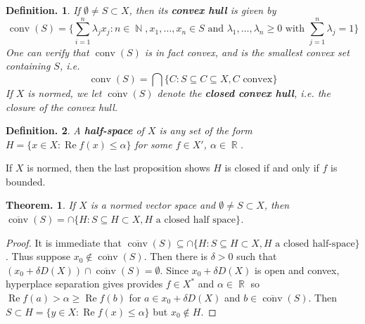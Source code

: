 \documentclass[11pt, a4paper]{memoir}
\DeclareMathOperator{\N}{{\mathbb{N}}}
\DeclareMathOperator{\R}{{\mathbb{R}}}
\theoremstyle{change}
\newtheorem{theorem}{Theorem.}[section]
\theoremstyle{plain}
\theoremstyle{nonumberplain}
\newtheorem{definition}{Definition.}
\newtheorem{proof}{Proof}
\renewcommand{\Re}{\ensuremath{\operatorname{Re}}}
\DeclareMathOperator{\conv}{conv}
\numberwithin{equation}{section}
\begin{document}
\begin{definition}
    If $\emptyset\neq S\subset X$, then its \textbf{convex hull} is given by
    \begin{equation*}
        \conv(S) = \{\sum_{i=1}^n\lambda_jx_j:n\in\N,x_1,\ldots,x_n\in S\text{ and }\lambda_1,\ldots,\lambda_n\geq 0\text{ with }\sum_{j=1}^n\lambda_j=1\}
    \end{equation*}
    One can verify that $\conv(S)$ is in fact convex, and is the smallest convex set containing $S$, i.e.
    \begin{equation*}
        \conv(S)=\bigcap\{C:S\subseteq C\subseteq X,C\text{ convex}\}
    \end{equation*}
    If $X$ is normed, we let $\overline{\conv}(S)$ denote the \textbf{closed convex hull}, i.e. the closure of the convex hull.
\end{definition}
\begin{definition}
    A \textbf{half-space} of $X$ is any set of the form $H=\{x\in X:\Re f(x)\leq \alpha\}$ for some $f\in X'$, $\alpha\in\R$.
\end{definition}
If $X$ is normed, then the last proposition shows $H$ is closed if and only if $f$ is bounded.
\begin{theorem}
    If $X$ is a normed vector space and $\emptyset\neq S\subset X$, then $\overline{\conv}(S)=\cap\{H:S\subseteq H\subset X, H\text{ a closed half space}\}$.
\end{theorem}
\begin{proof}
    It is immediate that $\overline{\conv}(S)\subseteq\cap\{H:S\subseteq H\subset X,H\text{ a closed half-space}\}$.
    Thus suppose $x_0\notin \overline{\conv}(S)$.
    Then there is $\delta>0$ such that $(x_0+\delta D(X))\cap\overline{\conv}(S)=\emptyset$.
    Since $x_0+\delta D(X)$ is open and convex, hyperplace separation gives provides $f\in X^*$ and $\alpha\in\R$ so $\Re f(a)>\alpha\geq\Re f(b)$ for $a\in x_0+\delta D(X)$ and $b\in\overline{\conv}(S)$.
    Then $S\subset H=\{y\in X:\Re f(x)\leq\alpha\}$ but $x_0\notin H$.
\end{proof}
\end{document}
